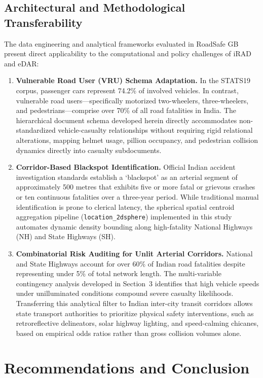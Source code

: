 \documentclass[11pt,a4paper]{article}
\begin{document}
\subsection{Architectural and Methodological Transferability}
The data engineering and analytical frameworks evaluated in RoadSafe GB present direct applicability to the computational and policy challenges of iRAD and eDAR:
\begin{enumerate}
\item \textbf{Vulnerable Road User (VRU) Schema Adaptation.} In the STATS19 corpus, passenger cars represent 74.2\% of involved vehicles. In contrast, vulnerable road users---specifically motorized two-wheelers, three-wheelers, and pedestrians---comprise over 70\% of all road fatalities in India. The hierarchical document schema developed herein directly accommodates non-standardized vehicle-casualty relationships without requiring rigid relational alterations, mapping helmet usage, pillion occupancy, and pedestrian collision dynamics directly into casualty subdocuments.
\item \textbf{Corridor-Based Blackspot Identification.} Official Indian accident investigation standards establish a `blackspot' as an arterial segment of approximately 500 metres that exhibits five or more fatal or grievous crashes or ten continuous fatalities over a three-year period. While traditional manual identification is prone to clerical latency, the spherical spatial centroid aggregation pipeline (\texttt{location\_2dsphere}) implemented in this study automates dynamic density bounding along high-fatality National Highways (NH) and State Highways (SH).
\item \textbf{Combinatorial Risk Auditing for Unlit Arterial Corridors.} National and State Highways account for over 60\% of Indian road fatalities despite representing under 5\% of total network length. The multi-variable contingency analysis developed in Section~3 identifies that high vehicle speeds under unilluminated conditions compound severe casualty likelihoods. Transferring this analytical filter to Indian inter-city transit corridors allows state transport authorities to prioritize physical safety interventions, such as retroreflective delineators, solar highway lighting, and speed-calming chicanes, based on empirical odds ratios rather than gross collision volumes alone.
\end{enumerate}
\clearpage
\section{Recommendations and Conclusion}
\end{document}
